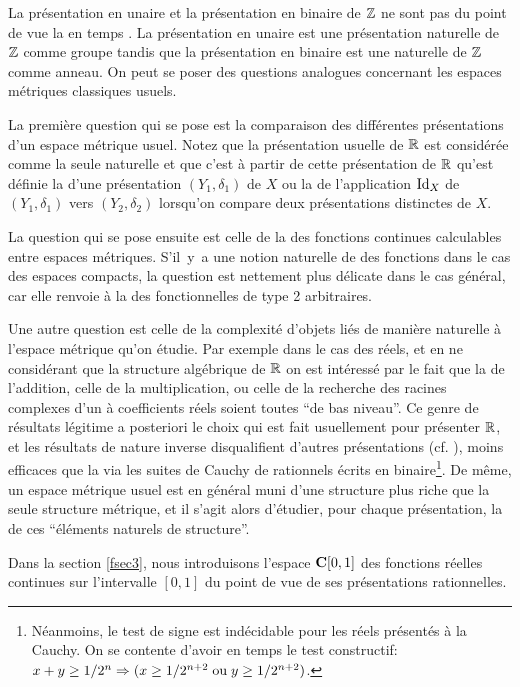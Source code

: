 \smallskip La présentation en unaire et la présentation en binaire de  
$\mathbb {Z}$  ne sont pas \equivas du point de vue la 
\com en temps \poll. La présentation en unaire est une présentation 
naturelle de  $\mathbb {Z}$  comme groupe tandis que 
la présentation en binaire est une \pres naturelle de  $\mathbb {Z}$  comme anneau. 
On peut se poser des questions analogues concernant les espaces métriques 
classiques usuels.

\smallskip La première question qui se pose est la comparaison des 
différentes présentations d'un espace métrique usuel.  Notez que la 
présentation usuelle de  $\mathbb {R}$  est considérée comme la seule naturelle 
et que c'est à partir de cette présentation de  $\mathbb {R}$  qu'est définie la 
\com d'une présentation  $(Y_1, \delta_1)$  de  $X$  ou la \com de 
l'application ${\rm Id}_X$  de  $(Y_1, \delta_1)$  vers  $(Y_2, \delta_2)$  lorsqu'on 
compare deux présentations distinctes de  $X $.

\smallskip La question qui se pose ensuite est celle de la \com des fonctions continues calculables entre espaces métriques.  S'il~y~a une notion naturelle de \com des fonctions dans le cas des espaces compacts, la question est nettement plus délicate dans le cas général, car elle renvoie à la \com des fonctionnelles de type 2 arbitraires.
 
\smallskip Une autre question est celle de la complexité d'objets liés de 
manière naturelle à l'espace métrique qu'on étudie. Par exemple dans le 
cas des réels, et en ne considérant que la structure algébrique de  $\mathbb {R}$  
on est intéressé par le fait que la \com de l'addition, celle de la 
multiplication, ou celle de la recherche des racines complexes d'un \pol 
à coefficients réels soient toutes ``de bas niveau''. 
Ce genre de résultats légitime a posteriori le choix qui est fait usuellement pour présenter $\mathbb {R}$, et les résultats de nature inverse disqualifient d'autres présentations (cf. \cite{fLL}), moins efficaces que la \pres via les suites de Cauchy de rationnels écrits en binaire{\footnote{Néanmoins, le test de signe est indécidable pour les réels présentés à la Cauchy. 
On se contente d'avoir en temps \poll le test constructif:  
$x + y \geq  1/2^n  \Rightarrow   ( x \geq  1/2^{n+2} \; \hbox{ou}\;  
y \geq  1/2^{n+2} )$.}}. 
De même, un espace métrique usuel est en général muni d'une structure 
plus riche que la seule structure métrique, et il s'agit alors d'étudier,
 pour chaque présentation, la \com de ces ``éléments naturels de 
structure''.


\medskip 
Dans la section \ref{fsec3}, nous introduisons l'espace  ${{\bf C}[0,1]}$  des fonctions réelles \uni continues sur l'intervalle $[0,1]$ du point de vue de ses présentations rationnelles.
 
